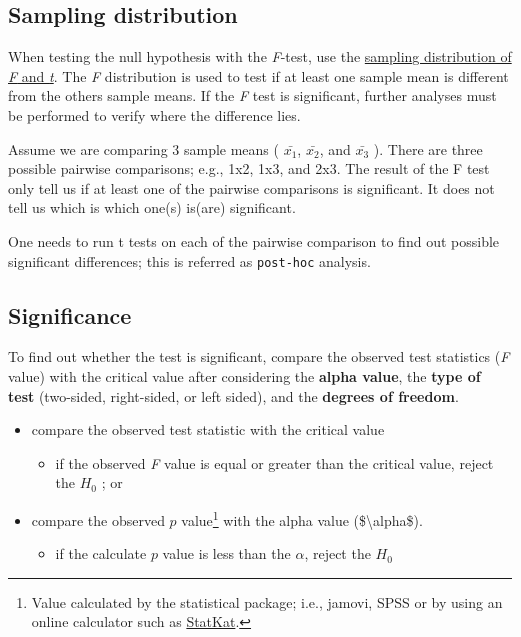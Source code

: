 \documentclass[
]{article}
\providecommand{\tightlist}{%
  \setlength{\itemsep}{0pt}\setlength{\parskip}{0pt}}
\begin{document}
\hypertarget{sampling-distribution}{%
\subsection{Sampling distribution}\label{sampling-distribution}}

When testing the null hypothesis with the \emph{F}-test, use the \href{https://statkat.com/sampling-distribution/anova/f-and-t.php}{sampling distribution of \emph{F} and \emph{t}}. The \emph{F} distribution is used to test if at least one sample mean is different from the others sample means. If the \emph{F} test is significant, further analyses must be performed to verify where the difference lies.

Assume we are comparing 3 sample means ( \(\bar{x_1}\), \(\bar{x_2}\), and \(\bar{x_3}\) ). There are three possible pairwise comparisons; e.g., 1x2, 1x3, and 2x3. The result of the F test only tell us if at least one of the pairwise comparisons is significant. It does not tell us which is which one(s) is(are) significant.

One needs to run t tests on each of the pairwise comparison to find out possible significant differences; this is referred as \texttt{post-hoc} analysis.

\hypertarget{significance}{%
\subsection{Significance}\label{significance}}

To find out whether the test is significant, compare the observed test statistics (\emph{F} value) with the critical value after considering the \textbf{alpha value}, the \textbf{type of test} (two-sided, right-sided, or left sided), and the \textbf{degrees of freedom}.

\begin{itemize}
\item
  compare the observed test statistic with the critical value

  \begin{itemize}
  \tightlist
  \item
    if the observed \emph{F} value is equal or greater than the critical value, reject the \(H_0\) ; or
  \end{itemize}
\item
  compare the observed \(p\) value\footnote{Value calculated by the statistical package; i.e., jamovi, SPSS or by using an online calculator such as \href{https://statkat.com/online-calculators/critical-f-value-given-alpha.php}{StatKat}.} with the alpha value (\$\textbackslash alpha\$).

  \begin{itemize}
  \tightlist
  \item
    if the calculate \(p\) value is less than the \(\alpha\), reject the \(H_0\)
  \end{itemize}
\end{itemize}
\end{document}
